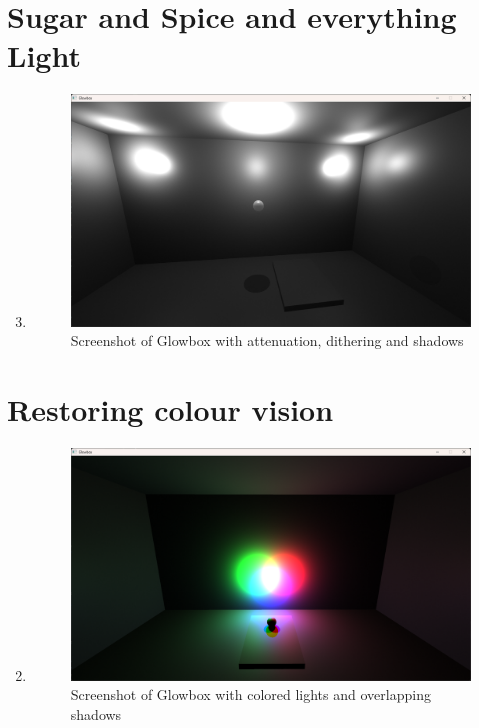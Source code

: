 \documentclass[11pt,a4paper]{report}
\begin{document}
\section{Sugar and Spice and everything Light}
\begin{enumerate}[label=(\alph*)]\setcounter{enumi}{2}
	\item \hfill
	
	\begin{figure}[h]
		\centering
		\includegraphics[width=\textwidth]{images/task2c.png}
		\caption{Screenshot of Glowbox with attenuation, dithering and shadows}
	\end{figure}
\end{enumerate}

\clearpage
\section{Restoring colour vision}
\begin{enumerate}[label=(\alph*)]\setcounter{enumi}{1}
	\item \hfill
	
	\begin{figure}[h]
		\includegraphics[width=\textwidth]{images/task3b_2.png}
		\caption{Screenshot of Glowbox with colored lights and overlapping shadows}
	\end{figure}

	
\end{enumerate}
\end{document}
